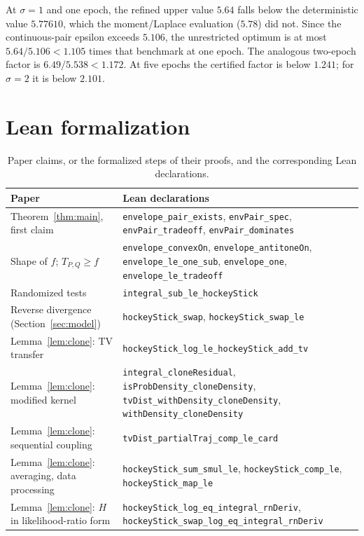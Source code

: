 \documentclass[conference]{IEEEtran}
\begin{document}
At $\sigma=1$ and one epoch, the refined upper value $5.64$ falls below the deterministic value $5.77610$, which the moment/Laplace evaluation ($5.78$) did not. Since the continuous-pair epsilon exceeds $5.106$, the unrestricted optimum is at most $5.64/5.106<1.105$ times that benchmark at one epoch. The analogous two-epoch factor is $6.49/5.538<1.172$. At five epochs the certified factor is below $1.241$; for $\sigma=2$ it is below $2.101$.

\section{Lean formalization}\label{sec:lean}
\begin{table}[t]
\centering
\caption{Paper claims, or the formalized steps of their proofs, and the corresponding Lean declarations.}
\label{tab:lean}
\footnotesize
\begin{tabular}{@{}>{\raggedright\arraybackslash}p{}>{\raggedright\arraybackslash}p{}@{}}
\toprule
Paper & Lean declarations\\
\midrule
Theorem~\ref{thm:main}, first claim & \texttt{envelope\_pair\_exists}, \texttt{envPair\_spec}, \texttt{envPair\_tradeoff}, \texttt{envPair\_dominates}\\
Shape of $f$; $T_{P,Q}\ge f$ & \texttt{envelope\_convexOn}, \texttt{envelope\_antitoneOn}, \texttt{envelope\_le\_one\_sub}, \texttt{envelope\_one}, \texttt{envelope\_le\_tradeoff}\\
Randomized tests & \texttt{integral\_sub\_le\_hockeyStick}\\
Reverse divergence (Section~\ref{sec:model}) & \texttt{hockeyStick\_swap}, \texttt{hockeyStick\_swap\_le}\\
Lemma~\ref{lem:clone}: TV transfer & \texttt{hockeyStick\_log\_le\_hockeyStick\_add\_tv}\\
Lemma~\ref{lem:clone}: modified kernel & \texttt{integral\_cloneResidual}, \texttt{isProbDensity\_cloneDensity}, \texttt{tvDist\_withDensity\_cloneDensity}, \texttt{withDensity\_cloneDensity}\\
Lemma~\ref{lem:clone}: sequential coupling & \texttt{tvDist\_partialTraj\_comp\_le\_card}\\
Lemma~\ref{lem:clone}: averaging, data processing & \texttt{hockeyStick\_sum\_smul\_le}, \texttt{hockeyStick\_comp\_le}, \texttt{hockeyStick\_map\_le}\\
Lemma~\ref{lem:clone}: $H$ in likelihood-ratio form & \texttt{hockeyStick\_log\_eq\_integral\_rnDeriv}, \texttt{hockeyStick\_swap\_log\_eq\_integral\_rnDeriv}\\

\end{tabular}
\end{table}
\end{document}
